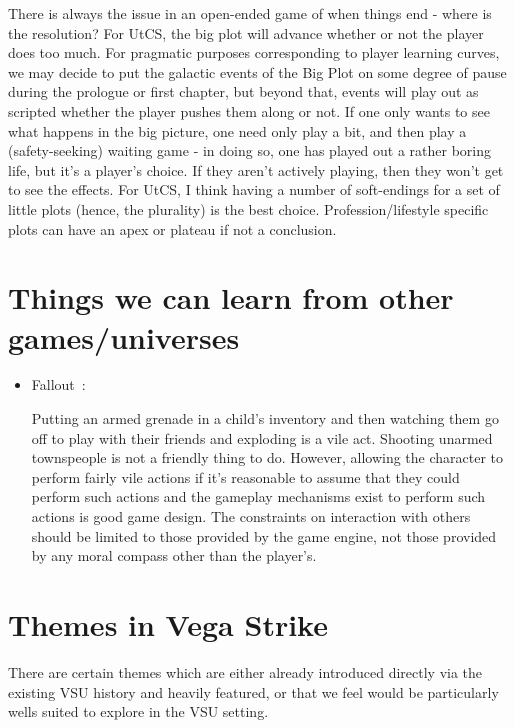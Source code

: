 There is always the issue in an open-ended game of when things end -
where is the resolution? For UtCS, the big plot will advance whether
or not the player does too much. For pragmatic purposes corresponding
to player learning curves, we may decide to put the galactic events of
the Big Plot on some degree of pause during the prologue or first
chapter, but beyond that, events will play out as scripted whether the
player pushes them along or not. If one only wants to see what happens
in the big picture, one need only play a bit, and then play a
(safety-seeking) waiting game - in doing so, one has played out a
rather boring life, but it's a player's choice. If they aren't
actively playing, then they won't get to see the effects.  For UtCS, I
think having a number of soft-endings for a set of little plots
(hence, the plurality) is the best choice. Profession/lifestyle
specific plots can have an apex or plateau if not a conclusion.


\section{Things we can learn from other games/universes}

\begin{itemize}
\item Fallout~\cite{FalloutRPG}:

Putting an armed grenade in a child's inventory and then watching them
go off to play with their friends and exploding is a vile
act. Shooting unarmed townspeople is not a friendly thing to
do. However, allowing the character to perform fairly vile actions if
it's reasonable to assume that they could perform such actions and the
gameplay mechanisms exist to perform such actions is good game
design. The constraints on interaction with others should be limited
to those provided by the game engine, not those provided by any moral
compass other than the player's.

\end{itemize}

\section{Themes in Vega Strike}
\label{sec:VSthemes}
There are certain themes which are either already introduced directly
via the existing VSU history and heavily featured, or that we feel
would be particularly wells suited to explore in the VSU setting.

